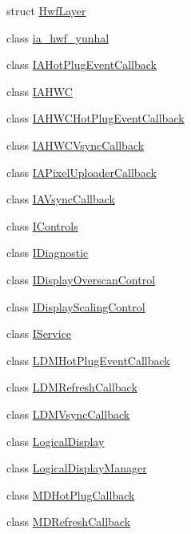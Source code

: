 \begin{DoxyCompactItemize}
struct \mbox{\hyperlink{structhwcomposer_1_1HwfLayer}{Hwf\+Layer}}
\item 
class \mbox{\hyperlink{classhwcomposer_1_1ia__hwf__yunhal}{ia\+\_\+hwf\+\_\+yunhal}}
\item 
class \mbox{\hyperlink{classhwcomposer_1_1IAHotPlugEventCallback}{I\+A\+Hot\+Plug\+Event\+Callback}}
\item 
class \mbox{\hyperlink{classhwcomposer_1_1IAHWC}{I\+A\+H\+WC}}
\item 
class \mbox{\hyperlink{classhwcomposer_1_1IAHWCHotPlugEventCallback}{I\+A\+H\+W\+C\+Hot\+Plug\+Event\+Callback}}
\item 
class \mbox{\hyperlink{classhwcomposer_1_1IAHWCVsyncCallback}{I\+A\+H\+W\+C\+Vsync\+Callback}}
\item 
class \mbox{\hyperlink{classhwcomposer_1_1IAPixelUploaderCallback}{I\+A\+Pixel\+Uploader\+Callback}}
\item 
class \mbox{\hyperlink{classhwcomposer_1_1IAVsyncCallback}{I\+A\+Vsync\+Callback}}
\item 
class \mbox{\hyperlink{classhwcomposer_1_1IControls}{I\+Controls}}
\item 
class \mbox{\hyperlink{classhwcomposer_1_1IDiagnostic}{I\+Diagnostic}}
\item 
class \mbox{\hyperlink{classhwcomposer_1_1IDisplayOverscanControl}{I\+Display\+Overscan\+Control}}
\item 
class \mbox{\hyperlink{classhwcomposer_1_1IDisplayScalingControl}{I\+Display\+Scaling\+Control}}
\item 
class \mbox{\hyperlink{classhwcomposer_1_1IService}{I\+Service}}
\item 
class \mbox{\hyperlink{classhwcomposer_1_1LDMHotPlugEventCallback}{L\+D\+M\+Hot\+Plug\+Event\+Callback}}
\item 
class \mbox{\hyperlink{classhwcomposer_1_1LDMRefreshCallback}{L\+D\+M\+Refresh\+Callback}}
\item 
class \mbox{\hyperlink{classhwcomposer_1_1LDMVsyncCallback}{L\+D\+M\+Vsync\+Callback}}
\item 
class \mbox{\hyperlink{classhwcomposer_1_1LogicalDisplay}{Logical\+Display}}
\item 
class \mbox{\hyperlink{classhwcomposer_1_1LogicalDisplayManager}{Logical\+Display\+Manager}}
\item 
class \mbox{\hyperlink{classhwcomposer_1_1MDHotPlugCallback}{M\+D\+Hot\+Plug\+Callback}}
\item 
class \mbox{\hyperlink{classhwcomposer_1_1MDRefreshCallback}{M\+D\+Refresh\+Callback}}

\end{DoxyCompactItemize}

